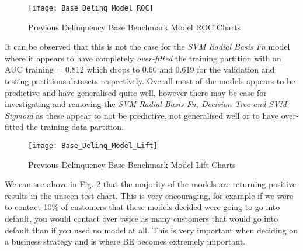 \begin{figure}[H]
	\texttt{[image: Base\_Delinq\_Model\_ROC]}
	\caption{Previous Delinquency Base Benchmark Model ROC Charts}
	\label{fig:Delinq_Model_ROC}
\end{figure}

It can be observed that this is not the case for the \textit{SVM Radial Basis Fn} model where it appears to have completely \textit{over-fitted} the training partition with an AUC training = 0.812 which drops to 0.60 and 0.619 for the validation and testing partitions datasets respectively. Overall most of the models appears to be predictive and have generalised quite well, however there may be case for investigating and removing the \textit{SVM Radial Basis Fn, Decision Tree and SVM Sigmoid} as these appear to not be predictive, not generalised well or to have over-fitted the training data partition. 

\begin{figure}[H]
	\texttt{[image: Base\_Delinq\_Model\_Lift]}
	\caption{Previous Delinquency Base Benchmark Model Lift Charts}
	\label{fig:Delinq_Model_Lift}
\end{figure}

We can see above in Fig. \ref{fig:Delinq_Model_Lift} that the majority of the models are returning positive results in the unseen test chart. This is very encouraging, for example if we were to contact 10\% of customers that these models decided were going to go into default, you would contact over twice as many customers that would go into default than if you used no model at all. This is very important when deciding on a business strategy and is where BE becomes extremely important. 

